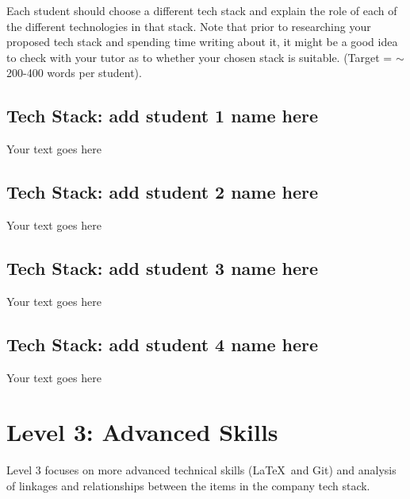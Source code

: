 \documentclass[a4paper, 11pt]{report}
\begin{document}
Each student should choose a different tech stack and explain the role of each of the different technologies in that stack. Note that prior to researching your proposed tech stack and spending time writing about it, it might be a good idea to check with your tutor as to whether your chosen stack is suitable. (Target = $\sim$200-400 words per student).

\subsection{Tech Stack: add student 1 name here}

Your text goes here

\subsection{Tech Stack: add student 2 name here}

Your text goes here

\subsection{Tech Stack: add student 3 name here}

Your text goes here

\subsection{Tech Stack: add student 4 name here}

Your text goes here



\newpage
\section{Level 3: Advanced Skills}

Level 3 focuses on more advanced technical skills (\LaTeX\ and Git) and analysis of linkages and relationships between the items in the company tech stack.
\end{document}
